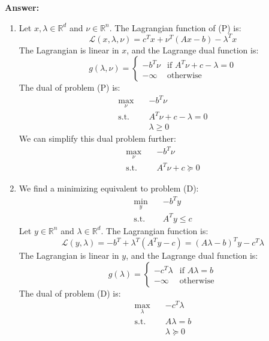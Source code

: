 \documentclass[11pt,a4paper]{article}
\newenvironment{solution}{
  \par\noindent\textbf{Answer:}\vspace{0.3em}
}{\vspace{1em}}
\begin{document}
\begin{solution}
    \begin{enumerate}
        \item Let $x, \lambda \in \mathbb{R}^d$ and $\nu \in \mathbb{R}^n $. The Lagrangian function of (P) is: $$\mathcal{L}(x, \lambda, \nu) = c^T x + \nu^T (Ax - b) - \lambda^T x$$
        The Lagrangian is linear in $x$, and the Lagrange dual function is: $$g(\lambda, \nu) = \begin{cases}
            -b^T \nu &\text{if } A^T \nu + c - \lambda = 0\\
            -\infty &\text{otherwise}
        \end{cases}$$
        The dual of problem (P) is:
        $$\begin{aligned}
            \max_{\nu} \quad & -b^T \nu\\
            \text{s.t.} \quad & A^T \nu + c - \lambda = 0\\
            & \lambda \geq 0
        \end{aligned}$$
        We can simplify this dual problem further:
        $$\begin{aligned}
            \max_{\nu} \quad & -b^T \nu\\
            \text{s.t.} \quad & A^T \nu + c \succeq 0
        \end{aligned}$$



        \item We find a minimizing equivalent to problem (D):
        $$\begin{aligned}
            \min_{y} \quad & -b^T y\\
            \text{s.t.} \quad & A^T y \leq c
        \end{aligned}$$
        Let $y \in \mathbb{R}^n$ and $\lambda \in \mathbb{R}^d$. The Lagrangian function is: $$\mathcal{L}(y, \lambda) = -b^T + \lambda^T (A^T y - c) = (A \lambda - b)^T y - c^T \lambda$$
        The Lagrangian is linear in $y$, and the Lagrange dual function is: $$g(\lambda) = \begin{cases}
            -c^T \lambda &\text{if } A \lambda = b\\
            -\infty &\text{otherwise}
        \end{cases}$$
        The dual of problem (D) is:$$\begin{aligned}
            \max_\lambda \quad & -c^T \lambda\\
            \text{s.t.} \quad & A\lambda = b\\
            & \lambda \succeq 0
        \end{aligned}$$
        



\end{enumerate}
\end{solution}
\end{document}
